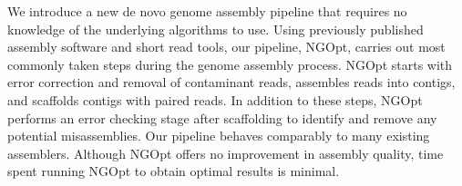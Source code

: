 \documentclass{bioinfo}
\begin{document}
We introduce a new de novo genome assembly pipeline that requires no knowledge
of the underlying algorithms to use. Using previously 
published assembly software and short read tools, our pipeline, NGOpt, carries out
most commonly taken steps during the genome assembly process. NGOpt starts with error correction
and removal of contaminant reads, assembles reads into contigs, and scaffolds
contigs with paired reads. In addition to these steps, NGOpt performs an 
error checking stage after scaffolding to identify and remove any potential misassemblies. 
Our pipeline behaves comparably to many existing assemblers. Although NGOpt offers no improvement
in assembly quality, time spent running NGOpt to obtain optimal results is minimal. 

\end{document}
